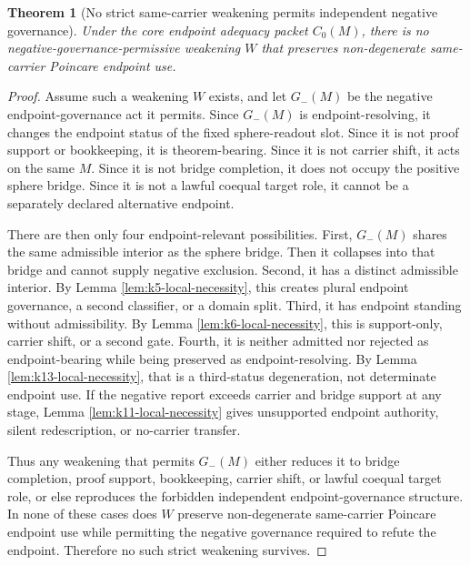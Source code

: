 \documentclass[11pt]{article}
\newtheorem{theorem}{Theorem}[section]
\begin{document}
\begin{theorem}[No strict same-carrier weakening permits independent negative governance]\label{thm:no-strict-weakening}
Under the core endpoint adequacy packet \(C_0(M)\), there is no negative-governance-permissive weakening \(W\) that preserves non-degenerate same-carrier Poincare endpoint use.
\end{theorem}
\begin{proof}
Assume such a weakening \(W\) exists, and let \(G_-(M)\) be the negative endpoint-governance act it permits.  Since \(G_-(M)\) is endpoint-resolving, it changes the endpoint status of the fixed sphere-readout slot.  Since it is not proof support or bookkeeping, it is theorem-bearing.  Since it is not carrier shift, it acts on the same \(M\).  Since it is not bridge completion, it does not occupy the positive sphere bridge.  Since it is not a lawful coequal target role, it cannot be a separately declared alternative endpoint.

There are then only four endpoint-relevant possibilities.  First, \(G_-(M)\) shares the same admissible interior as the sphere bridge.  Then it collapses into that bridge and cannot supply negative exclusion.  Second, it has a distinct admissible interior.  By Lemma \ref{lem:k5-local-necessity}, this creates plural endpoint governance, a second classifier, or a domain split.  Third, it has endpoint standing without admissibility.  By Lemma \ref{lem:k6-local-necessity}, this is support-only, carrier shift, or a second gate.  Fourth, it is neither admitted nor rejected as endpoint-bearing while being preserved as endpoint-resolving.  By Lemma \ref{lem:k13-local-necessity}, that is a third-status degeneration, not determinate endpoint use.  If the negative report exceeds carrier and bridge support at any stage, Lemma \ref{lem:k11-local-necessity} gives unsupported endpoint authority, silent redescription, or no-carrier transfer.

Thus any weakening that permits \(G_-(M)\) either reduces it to bridge completion, proof support, bookkeeping, carrier shift, or lawful coequal target role, or else reproduces the forbidden independent endpoint-governance structure.  In none of these cases does \(W\) preserve non-degenerate same-carrier Poincare endpoint use while permitting the negative governance required to refute the endpoint.  Therefore no such strict weakening survives.
\end{proof}
\end{document}
